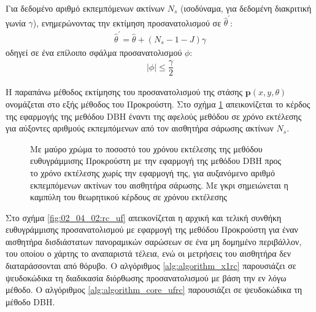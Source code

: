 \begin{gg_box}
\begin{remark}
  \label{remark:02_04_02:03}
  Για δεδομένο αριθμό εκπεμπόμενων ακτίνων $N_s$ (ισοδύναμα, για δεδομένη
  διακριτική γωνία $\gamma$), ενημερώνοντας την εκτίμηση προσανατολισμού σε
  $\hat{\theta}^\prime$:
  \begin{align}
    \hat{\theta}^\prime = \hat{\theta} + (N_s-1-J) \gamma \label{eq:update_t3}
  \end{align}
  οδηγεί σε ένα επίλοιπο σφάλμα προσανατολισμού $\phi$:
  \begin{align}
    |\phi| \leq \dfrac{\gamma}{2}  \label{eq:phi_3}
  \end{align}
\end{remark}
\end{gg_box}

Η παραπάνω μέθοδος εκτίμησης του προσανατολισμού της στάσης $\bm{p}(x,y,\theta)$
ονομάζεται στο εξής μέθοδος του Προκρούστη. Στο σχήμα
\ref{fig:02_04_02:ku_vs_dbh} απεικονίζεται το κέρδος της εφαρμογής της μεθόδου
DBH έναντι της αφελούς μεθόδου σε χρόνο εκτέλεσης για αύξοντες αριθμούς
εκπεμπόμενων από τον αισθητήρα σάρωσης ακτίνων $N_s$.

\begin{figure}[h]\centering
  \vspace{1.0cm}
  
  \vspace{0.5cm}
  \caption{\small Με μαύρο χρώμα το ποσοστό του χρόνου εκτέλεσης της μεθόδου
           ευθυγράμμισης Προκρούστη με την εφαρμογή της μεθόδου DBH προς το
           χρόνο εκτέλεσης χωρίς την εφαρμογή της, για αυξανόμενο αριθμό
           εκπεμπόμενων ακτίνων του αισθητήρα σάρωσης. Με γκρι σημειώνεται
           η καμπύλη του θεωρητικού κέρδους σε χρόνου εκτέλεσης}
  \label{fig:02_04_02:ku_vs_dbh}
\end{figure}

Στο σχήμα \ref{fig:02_04_02:rc_uf} απεικονίζεται η αρχική και τελική συνθήκη
ευθυγράμμισης προσανατολισμού με εφαρμογή της μεθόδου Προκρούστη για έναν
αισθητήρα δισδιάστατων πανοραμικών σαρώσεων σε ένα μη δομημένο περιβάλλον, του
οποίου ο χάρτης το αναπαριστά τέλεια, ενώ οι μετρήσεις του αισθητήρα δεν
διαταράσσονται από θόρυβο. Ο αλγόριθμος \ref{alg:algorithm_x1rc} παρουσιάζει
σε ψευδοκώδικα τη διαδικασία διόρθωσης προσανατολισμού με βάση την εν λόγω
μέθοδο. Ο αλγόριθμος \ref{alg:algorithm_core_ufrc} παρουσιάζει σε ψευδοκώδικα
τη μέθοδο DBH.

